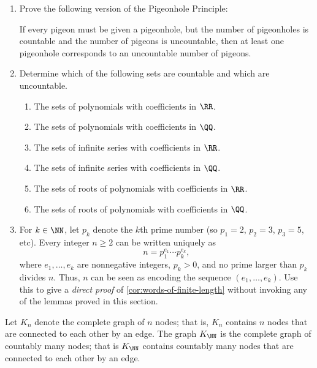 \begin{exercises}\hfill

\begin{enumerate}
\item
  Prove the following version of the Pigeonhole Principle:

  \begin{fact}
    If every pigeon must be given a pigeonhole, but the number of pigeonholes is countable and the number of pigeons is uncountable, then at least one pigeonhole corresponds to an uncountable number of pigeons.
  \end{fact}

\item
  Determine which of the following sets are countable and which are uncountable.
  \begin{enumerate}
  \item
    The sets of polynomials with coefficients in $\RR$.
  \item
    The sets of polynomials with coefficients in $\QQ$.
  \item
    The sets of infinite series with coefficients in $\RR$.
  \item
    The sets of infinite series with coefficients in $\QQ$.
  \item
    The sets of roots of polynomials with coefficients in $\RR$.
  \item
    The sets of roots of polynomials with coefficients in $\QQ$.
  \end{enumerate}

\item
  For $k\in \NN$, let $p_k$ denote the $k$th prime number (so $p_1=2$, $p_2=3$, $p_3=5$, etc).
  Every integer $n\ge2$ can be written uniquely as
  \[
    n=p_1^{e_1}\cdots p_k^{e_k},
  \]
  where $e_1,\dots, e_k$ are nonnegative integers, $p_k>0$,  and no prime larger than $p_k$ divides $n$.
  Thus, $n$ can be seen as encoding the sequence $(e_1,\dots, e_k)$.
  Use this to give a \emph{direct proof} of \cref{cor:words-of-finite-length} without invoking  any of the lemmas proved in this section.
\end{enumerate}

\item
Let $K_n$ denote the complete graph of $n$ nodes;
that is, $K_n$ contains $n$ nodes that are connected to each other by an edge.
The graph $K_{\NN}$ is the complete graph of countably many nodes;
that is $K_{\NN}$ contains countably many nodes that are connected to each other by an edge.


\end{exercises}
